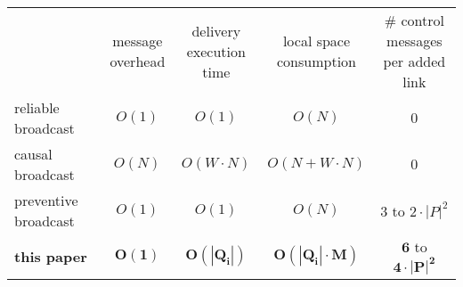 \newcommand{\cmark}{\ding{51}}%
\newcommand{\xmark}{\ding{55}}%


\small

\begin{tabularx}{1\columnwidth}{@{}Xcccc@{}}
  & \makecell{message\\overhead} &  \makecell{delivery\\execution time} & \makecell{local space\\consumption} & \makecell{\# control messages\\per added link} \\ \cmidrule{2-5}
  reliable broadcast~\cite{hadzilacos1994modular} & $O(1)$ & $O(1)$ & $O(N)$ & $0$ \\
  causal broadcast~\cite{schwarz1994detecting} & $O(N)$ & $O(W \cdot N)$ & $O(N+W\cdot N)$ & $0$ \\ 
  preventive broadcast~\cite{nedelec2018pcbroadcast} & $O(1)$ & $O(1)$ & $O(N)$ & $3$ to $2\cdot |P|^2$ \\ \hline\hline
  \textbf{this paper} & $\mathbf{O(1)}$ & $\mathbf{O(|Q_i|)}$ & $\mathbf{O(|Q_i| \cdot M)}$ & $\mathbf{6}$ to $\mathbf{4\cdot|P|^2}$ \\
\end{tabularx}

